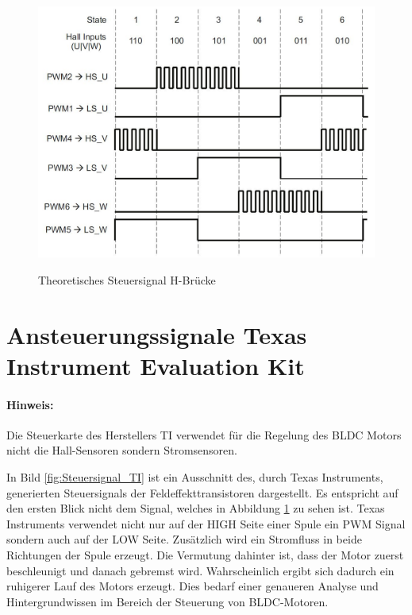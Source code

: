 \begin{figure}[htbp]
	\centering
	\includegraphics[width=\textwidth-6cm]{tests/graphics/Ansteuerung_H-Bruecke}
	\caption{Theoretisches Steuersignal H-Brücke}
	\label{fig:Steuersignal_H-Bruecke}
	\quelle \cite{Nisarga2011}
\end{figure}


\section{Ansteuerungssignale Texas Instrument Evaluation Kit}
\paragraph{Hinweis:}
Die Steuerkarte des Herstellers TI verwendet für die Regelung des BLDC Motors nicht die Hall-Sensoren sondern Stromsensoren.

In Bild \ref{fig:Steuersignal_TI} ist ein Ausschnitt des, durch Texas Instruments, generierten Steuersignals der Feldeffekttransistoren dargestellt.
Es entspricht auf den ersten Blick nicht dem Signal, welches in Abbildung \ref{fig:Steuersignal_H-Bruecke} zu sehen ist.
Texas Instruments verwendet nicht nur auf der HIGH Seite einer Spule ein PWM Signal sondern auch auf der LOW Seite.
Zusätzlich wird ein Stromfluss in beide Richtungen der Spule erzeugt. 
Die Vermutung dahinter ist, dass der Motor zuerst beschleunigt und danach gebremst wird.
Wahrscheinlich ergibt sich dadurch ein ruhigerer Lauf des Motors erzeugt.
Dies bedarf einer genaueren Analyse und Hintergrundwissen im Bereich der Steuerung von BLDC-Motoren.

